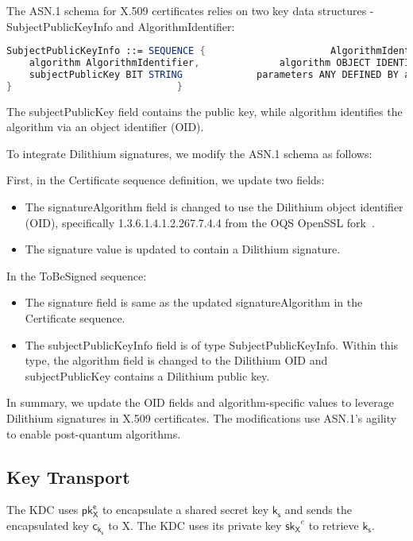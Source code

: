 \documentclass{article}
\begin{document}
The ASN.1 schema for X.509 certificates relies on two key data structures - SubjectPublicKeyInfo and AlgorithmIdentifier:

\begin{lstlisting}[language=Mathematica, basicstyle=\tiny]
SubjectPublicKeyInfo ::= SEQUENCE {                      AlgorithmIdentifier ::= SEQUENCE {
	algorithm AlgorithmIdentifier,				algorithm OBJECT IDENTIFIER,
	subjectPublicKey BIT STRING				parameters ANY DEFINED BY algorithm OPTIONAL
}							  }	


\end{lstlisting}

The subjectPublicKey field contains the public key, while algorithm identifies the algorithm via an object identifier (OID).

To integrate Dilithium signatures, we modify the ASN.1 schema as follows:

First, in the Certificate sequence definition, we update two fields:
\begin{itemize}[leftmargin=*]
	\item The signatureAlgorithm field is changed to use the Dilithium object identifier (OID), specifically 1.3.6.1.4.1.2.267.7.4.4 from the OQS OpenSSL fork~\cite{oqsOpenSSL}.
	\item The signature value is updated to contain a Dilithium signature.
\end{itemize}
In the ToBeSigned sequence:
\begin{itemize}[leftmargin=*]
	\item The signature field is same as the updated signatureAlgorithm in the Certificate sequence.
	\item The subjectPublicKeyInfo field is of type SubjectPublicKeyInfo. Within this type, the algorithm field is changed to the Dilithium OID and subjectPublicKey contains a Dilithium public key.
\end{itemize}

In summary, we update the OID fields and algorithm-specific values to leverage Dilithium signatures in X.509 certificates. The modifications use ASN.1's agility to enable post-quantum algorithms.

\subsection{Key Transport}
\label{sec:keyexchange}

The KDC uses $\mathsf{pk_{X}^e}$ to encapsulate a shared secret key $\mathsf{k_s}$ and sends the encapsulated key $\mathsf{c_{k_s}}$ to X. The KDC uses its private key $\mathsf{sk_{X}}^e$ to retrieve $\mathsf{k_s}$. 


 
\end{document}
